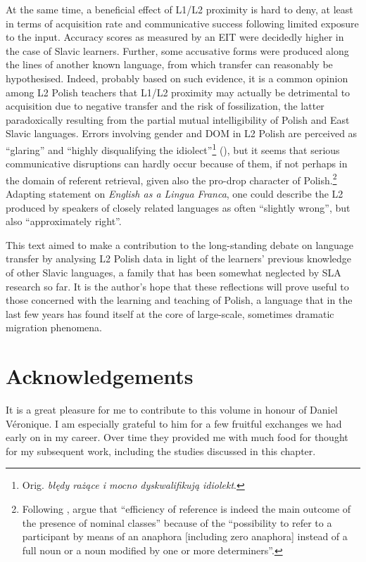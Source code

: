 \documentclass[output=paper,            colorlinks, citecolor=brown            		  ]{langscibook}
\begin{document}
At the same time, a beneficial effect of L1/L2 proximity is hard to deny, at least in terms of acquisition rate and communicative success following limited exposure to the input. Accuracy scores as measured by an EIT were decidedly higher in the case of Slavic learners. Further, some accusative forms were produced along the lines of another known language, from which transfer can reasonably be hypothesised. Indeed, probably based on such evidence, it is a common opinion among L2 Polish teachers that L1/L2 proximity may actually be detrimental to acquisition due to negative transfer and the risk of fossilization, the latter paradoxically resulting from the partial mutual intelligibility of Polish and East Slavic languages. Errors involving gender and DOM in L2 Polish are perceived as “glaring” and “highly disqualifying the idiolect”\footnote{ {Orig.} {\textit{błędy rażące i mocno dyskwalifikują idiolekt}}.} (\citealt[148--149]{Kravčuk2020}), but it seems that serious communicative disruptions can hardly occur because of them, if not perhaps in the domain of referent retrieval, given also the pro-drop character of Polish.\footnote{Following \citet{Martinet1967}, \citet[174--176]{FrajzyngierShay2003} argue that “efficiency of reference is indeed the main outcome of the presence of nominal classes” because of the “possibility to refer to a participant by means of an anaphora [including zero anaphora] instead of a full noun or a noun modified by one or more determiners”.} Adapting  statement on \textit{English as a Lingua Franca}, one could describe the L2 produced by speakers of closely related languages as often “slightly wrong”, but also “approximately right”. 

This text aimed to make a contribution to the long-standing debate on language transfer by analysing L2 Polish data in light of the learners’ previous knowledge of other Slavic languages, a family that has been somewhat neglected by SLA research so far. It is the author’s hope that these reflections will prove useful to those concerned with the learning and teaching of Polish, a language that in the last few years has found itself at the core of large-scale, sometimes dramatic migration phenomena.

\section*{Acknowledgements} 

It is a great pleasure for me to contribute to this volume in honour of Daniel Véronique. I am especially grateful to him for a few fruitful exchanges we had early on in my career. Over time they provided me with much food for thought for my subsequent work, including the studies discussed in this chapter.
\end{document}
